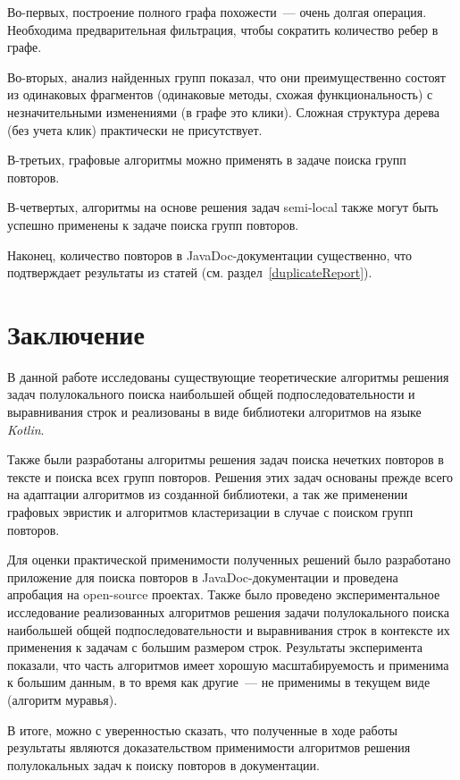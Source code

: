 Во-первых, построение полного графа похожести~--- очень долгая операция.
Необходима предварительная фильтрация, чтобы сократить количество ребер в графе. 

Во-вторых, анализ найденных  групп показал, что они преимущественно состоят из одинаковых фрагментов (одинаковые методы, схожая функциональность) с незначительными изменениями (в графе это клики).
Сложная структура дерева (без учета клик) практически не присутствует.

В-третьих, графовые алгоритмы можно применять в задаче {поиска групп повторов}.

В-четвертых, алгоритмы на основе решения задач {semi-local} также могут быть успешно применены к задаче {поиска групп повторов}.

Наконец, количество повторов в JavaDoc-документации существенно, что подтверждает результаты из статей (см. раздел~\ref{duplicateReport}).

\section*{Заключение}

В данной работе  исследованы существующие теоретические алгоритмы решения задач полулокального поиска наибольшей общей подпоследовательности и  выравнивания строк и реализованы в виде библиотеки алгоритмов на языке \emph{Kotlin}.

Также были разработаны алгоритмы решения задач поиска нечетких повторов в тексте и поиска всех групп повторов.
Решения  этих задач основаны прежде всего на адаптации алгоритмов из созданной библиотеки, а так же применении  графовых эвристик и алгоритмов кластеризации в случае с поиском групп повторов. 

Для оценки практической применимости полученных решений было разработано приложение для поиска повторов  в JavaDoc-документации и проведена апробация на {open-source} проектах. Также было проведено экспериментальное исследование реализованных алгоритмов
решения задачи полулокального поиска наибольшей общей подпоследовательности и  выравнивания строк в контексте их применения к задачам с большим размером строк.
Результаты эксперимента показали, что часть алгоритмов имеет хорошую масштабируемость и применима к {большим данным}, в то время как другие~--- не применимы в текущем виде (алгоритм {муравья}). 

В итоге, можно с уверенностью сказать, что полученные в ходе работы результаты являются доказательством применимости алгоритмов решения полулокальных задач к поиску повторов в документации.





